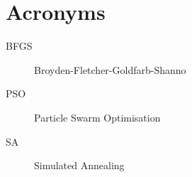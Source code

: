 \section*{Acronyms}

\begin{description}
	\item[BFGS] Broyden-Fletcher-Goldfarb-Shanno
	\item[PSO] Particle Swarm Optimisation
	\item[SA] Simulated Annealing
\end{description}